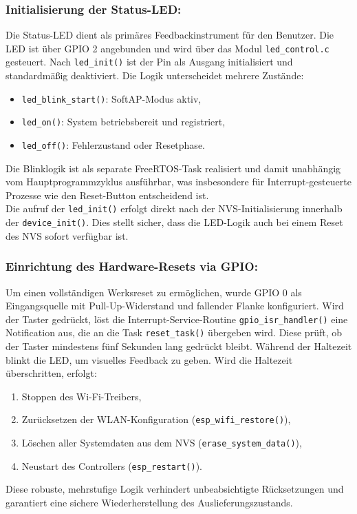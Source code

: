 \subsubsection{Initialisierung der Status-LED:}  
Die Status-LED dient als primäres Feedbackinstrument für den Benutzer. Die LED ist über GPIO 2 angebunden und wird über das Modul \texttt{led\_control.c} gesteuert. Nach \texttt{led\_init()} ist der Pin als Ausgang initialisiert und standardmäßig deaktiviert. Die Logik unterscheidet mehrere Zustände:
\begin{itemize}
	\item \texttt{led\_blink\_start()}: SoftAP-Modus aktiv,
	\item \texttt{led\_on()}: System betriebsbereit und registriert,
	\item \texttt{led\_off()}: Fehlerzustand oder Resetphase.
\end{itemize}
Die Blinklogik ist als separate FreeRTOS-Task realisiert und damit unabhängig vom Hauptprogrammzyklus ausführbar, was insbesondere für Interrupt-gesteuerte Prozesse wie den Reset-Button entscheidend ist.
\\
Die aufruf der \texttt{led\_init()} erfolgt direkt nach der NVS-Initialisierung innerhalb der \texttt{device\_init()}. Dies stellt sicher, dass die LED-Logik auch bei einem Reset des NVS sofort verfügbar ist. 
\subsubsection{Einrichtung des Hardware-Resets via GPIO:}  
Um einen vollständigen Werksreset zu ermöglichen, wurde GPIO 0 als Eingangsquelle mit Pull-Up-Widerstand und fallender Flanke konfiguriert. Wird der Taster gedrückt, löst die Interrupt-Service-Routine \texttt{gpio\_isr\_handler()} eine Notification aus, die an die Task \texttt{reset\_task()} übergeben wird. Diese prüft, ob der Taster mindestens fünf Sekunden lang gedrückt bleibt. Während der Haltezeit blinkt die LED, um visuelles Feedback zu geben. Wird die Haltezeit überschritten, erfolgt:
\begin{enumerate}
	\item Stoppen des Wi-Fi-Treibers,
	\item Zurücksetzen der WLAN-Konfiguration (\texttt{esp\_wifi\_restore()}),
	\item Löschen aller Systemdaten aus dem NVS (\texttt{erase\_system\_data()}),
	\item Neustart des Controllers (\texttt{esp\_restart()}).
\end{enumerate}
Diese robuste, mehrstufige Logik verhindert unbeabsichtigte Rücksetzungen und garantiert eine sichere Wiederherstellung des Auslieferungszustands.

